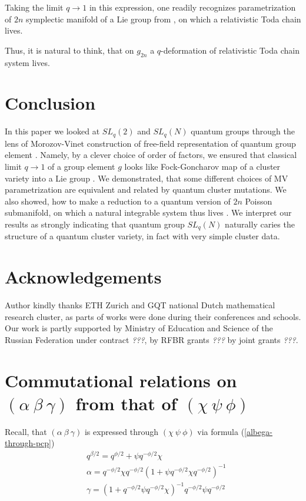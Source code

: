 \documentclass{article}
\newcommand{\lb}{\left (}
\newcommand{\rb}{\right )}
\newcommand{\be}{\begin{eqnarray}}
\newcommand{\ee}{\end{eqnarray}}
\newcommand {\?}{\textit{???}}
\def\classlim{q \rightarrow 1}
\newcommand{\delabel}[1]{(\ref{#1})}
\begin{document}
Taking the limit $\classlim$ in this expression, one readily recognizes
parametrization of $2n$ symplectic manifold of a Lie group from \cite{Mars1},
on which a relativistic Toda chain lives.


Thus, it is natural to think, that on $g_{2n}$ a $q$-deformation of relativistic Toda chain
system lives.

\section{Conclusion}
In this paper we looked at $SL_q(2)$ and $SL_q(N)$ quantum groups through
the lens of Morozov-Vinet construction of free-field representation of
quantum group element \cite{MV1}. Namely, by a clever choice of order of factors, we
ensured that classical limit $\classlim$ of a group element $g$ looks like
Fock-Goncharov map of a cluster variety into a Lie group \cite{FG2}.
We demonstrated, that some different choices of MV parametrization are equivalent
and related by quantum cluster mutations.
We also showed, how to make a reduction to a quantum version of $2n$ Poisson submanifold,
on which a natural integrable system thus lives \cite{Mars1}.
We interpret our results as strongly indicating that quantum group $SL_q(N)$ naturally
caries the structure of a quantum cluster variety, in fact with very simple cluster data.

\section*{Acknowledgements}

Author kindly thanks ETH Zurich and GQT national Dutch mathematical research cluster,
as parts of works were done during their conferences and schools.
Our work is partly supported by Ministry of Education and Science of
the Russian Federation under contract \?, by RFBR
grants \? by joint grants \?.

\appendix

\section{Commutational relations on $(\alpha\ \beta\ \gamma)$ from that of $(\chi\ \psi\ \phi)$}
\label{alpha-beta-gamma-from-chi-psi-phi}

Recall, that $(\alpha\ \beta\ \gamma)$ is expressed through $(\chi\ \psi\ \phi)$ via formula \delabel{albega-through-pcp}
\be
& q^{\beta/2} = q^{\phi/2} + \psi q^{-\phi/2} \chi \nonumber \\
& \alpha = q^{-\phi/2} \chi q^{-\phi/2} \lb 1 + \psi q^{-\phi/2} \chi q^{-\phi/2} \rb^{-1} \nonumber \\
& \gamma = \lb 1 + q^{-\phi/2} \psi q^{-\phi/2} \chi \rb^{-1} q^{-\phi/2} \psi q^{-\phi/2} \nonumber 
\ee
\end{document}
